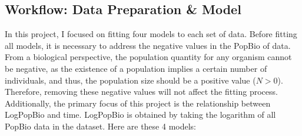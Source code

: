 \documentclass[11pt]{article}
\begin{document}
\subsection{Workflow: Data Preparation \& Model}
In this project, I focused on fitting four models to each set of data. Before fitting all models, it is necessary to address the negative values in the PopBio of data. From a biological perspective, the population quantity for any organism cannot be negative, as the existence of a population implies a certain number of individuals, and thus, the population size should be a positive value (\(N > 0\)). Therefore, removing these negative values will not affect the fitting process. Additionally, the primary focus of this project is the relationship between LogPopBio and time. LogPopBio is obtained by taking the logarithm of all PopBio data in the dataset. Here are these 4 models: 
\end{document}
